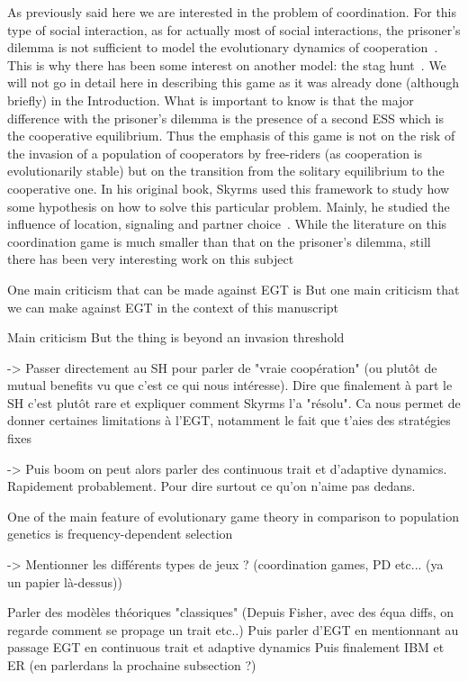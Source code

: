     As previously said here we are interested in the problem of coordination. For this type of social interaction, as for actually most of social interactions, the prisoner's dilemma is not sufficient to model the evolutionary dynamics of cooperation~\cite{Alvard2002, Skyrms2004}. This is why there has been some interest on another model: the stag hunt~\cite{Skyrms2004, RequejoMartinez2013}. We will not go in detail here in describing this game as it was already done (although briefly) in the Introduction. What is important to know is that the major difference with the prisoner's dilemma is the presence of a second ESS which is the cooperative equilibrium. Thus the emphasis of this game is not on the risk of the invasion of a population of cooperators by free-riders (as cooperation is evolutionarily stable) but on the transition from the solitary equilibrium to the cooperative one. In his original book, Skyrms used this framework to study how some hypothesis on how to solve this particular problem. Mainly, he studied the influence of location, signaling and partner choice~\cite{Skyrms2004}. While the literature on this coordination game is much smaller than that on the prisoner's dilemma, still there has been very interesting work on this subject~\cite{Santos2005, Pacheco2009, Iyer2016}

    One main criticism that can be made against EGT is 
    But one main criticism that we can make against EGT in the context of this manuscript

    Main criticism But the thing is beyond an invasion threshold 


    -> Passer directement au SH pour parler de "vraie coopération" (ou plutôt de mutual benefits vu que c'est ce qui nous intéresse). Dire que finalement à part le SH c'est plutôt rare et expliquer comment Skyrms l'a "résolu".
    Ca nous permet de donner certaines limitations à l'EGT, notamment le fait que t'aies des stratégies fixes 

    -> Puis boom on peut alors parler des continuous trait et d'adaptive dynamics. Rapidement probablement. Pour dire surtout ce qu'on n'aime pas dedans.

    One of the main feature of evolutionary game theory in comparison to population genetics is frequency-dependent selection

    -> Mentionner les différents types de jeux ? (coordination games, PD etc... (ya un papier là-dessus))


    Parler des modèles théoriques "classiques" (Depuis Fisher, avec des équa diffs, on regarde comment se propage un trait etc..)
    Puis parler d'EGT en mentionnant au passage EGT en continuous trait et adaptive dynamics
    Puis finalement IBM et ER (en parlerdans la prochaine subsection ?)
    

